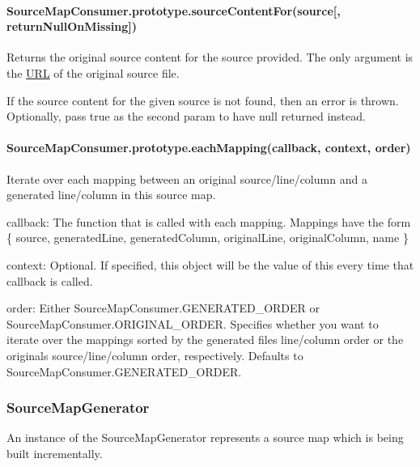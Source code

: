\paragraph*{Source\+Map\+Consumer.\+prototype.\+source\+Content\+For(source\mbox{[}, return\+Null\+On\+Missing\mbox{]})}

Returns the original source content for the source provided. The only argument is the \mbox{\hyperlink{namespace_u_r_l}{U\+RL}} of the original source file.

If the source content for the given source is not found, then an error is thrown. Optionally, pass {\ttfamily true} as the second param to have {\ttfamily null} returned instead.

\paragraph*{Source\+Map\+Consumer.\+prototype.\+each\+Mapping(callback, context, order)}

Iterate over each mapping between an original source/line/column and a generated line/column in this source map.


\begin{DoxyItemize}
\item {\ttfamily callback}\+: The function that is called with each mapping. Mappings have the form {\ttfamily \{ source, generated\+Line, generated\+Column, original\+Line, original\+Column, name \}}
\item {\ttfamily context}\+: Optional. If specified, this object will be the value of {\ttfamily this} every time that {\ttfamily callback} is called.
\item {\ttfamily order}\+: Either {\ttfamily Source\+Map\+Consumer.\+G\+E\+N\+E\+R\+A\+T\+E\+D\+\_\+\+O\+R\+D\+ER} or {\ttfamily Source\+Map\+Consumer.\+O\+R\+I\+G\+I\+N\+A\+L\+\_\+\+O\+R\+D\+ER}. Specifies whether you want to iterate over the mappings sorted by the generated file\textquotesingle{}s line/column order or the original\textquotesingle{}s source/line/column order, respectively. Defaults to {\ttfamily Source\+Map\+Consumer.\+G\+E\+N\+E\+R\+A\+T\+E\+D\+\_\+\+O\+R\+D\+ER}.
\end{DoxyItemize}

\subsubsection*{Source\+Map\+Generator}

An instance of the Source\+Map\+Generator represents a source map which is being built incrementally.

